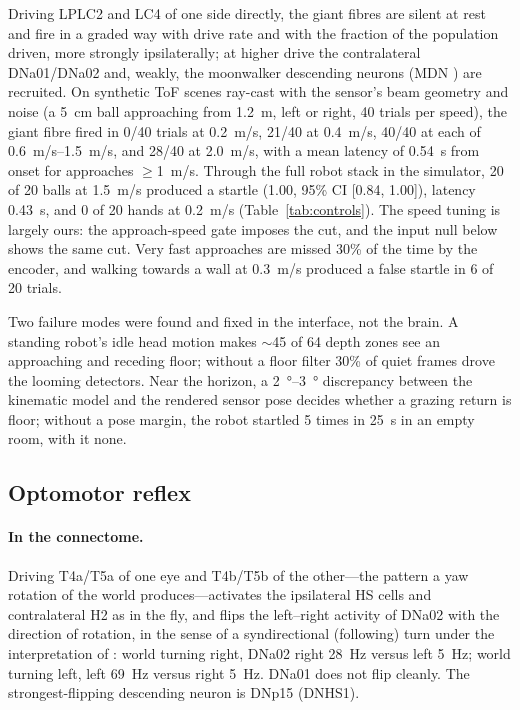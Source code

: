 \documentclass[10pt,a4paper]{article}
\begin{document}
Driving LPLC2 and LC4 of one side directly, the giant fibres are silent at rest and fire in a graded way
with drive rate and with the fraction of the population driven, more strongly ipsilaterally; at higher
drive the contralateral DNa01/DNa02 and, weakly, the moonwalker descending neurons (MDN \cite{bidaye2014})
are recruited. On synthetic ToF scenes ray-cast with the sensor's beam geometry and noise (a
\SI{5}{cm} ball approaching from \SI{1.2}{m}, left or right, 40 trials per speed), the giant fibre fired
in 0/40 trials at \SI{0.2}{m/s}, 21/40 at \SI{0.4}{m/s}, 40/40 at each of \SIrange{0.6}{1.5}{m/s}, and
28/40 at \SI{2.0}{m/s}, with a mean latency of \SI{0.54}{s} from onset for approaches $\geq$\SI{1}{m/s}.
Through the full robot stack in the simulator, 20 of 20 balls at \SI{1.5}{m/s} produced a startle
(1.00, 95\% CI [0.84, 1.00]), latency \SI{0.43}{s}, and 0 of 20 hands at \SI{0.2}{m/s}
(Table~\ref{tab:controls}). The speed tuning is largely ours: the approach-speed gate imposes the cut,
and the input null below shows the same cut. Very fast approaches are missed 30\% of the time by the
encoder, and walking towards a wall at \SI{0.3}{m/s} produced a false startle in 6 of 20 trials.

Two failure modes were found and fixed in the interface, not the brain. A standing robot's idle head
motion makes $\sim$45 of 64 depth zones see an approaching and receding floor; without a floor filter 30\%
of quiet frames drove the looming detectors. Near the horizon, a \SIrange{2}{3}{\degree} discrepancy
between the kinematic model and the rendered sensor pose decides whether a grazing return is floor; without
a pose margin, the robot startled 5 times in \SI{25}{s} in an empty room, with it none.

\subsection{Optomotor reflex}

\paragraph{In the connectome.} Driving T4a/T5a of one eye and T4b/T5b of the other---the pattern a yaw
rotation of the world produces---activates the ipsilateral HS cells and contralateral H2 as in the fly,
and flips the left--right activity of DNa02 with the direction of rotation, in the sense of a
syndirectional (following) turn under the interpretation of \cite{rayshubskiy2020}: world turning right,
DNa02 right \SI{28}{Hz} versus left \SI{5}{Hz}; world turning left, left \SI{69}{Hz} versus right
\SI{5}{Hz}. DNa01 does not flip cleanly. The strongest-flipping descending neuron is DNp15 (DNHS1).
\end{document}
